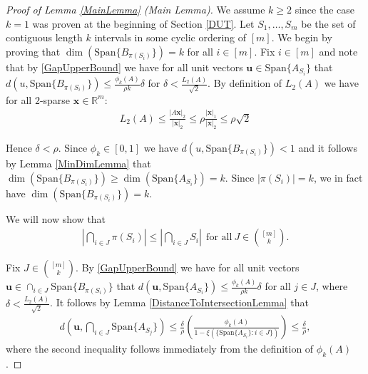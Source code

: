 \documentclass[journal, onecolumn]{IEEEtran}
\begin{document}
\begin{proof}[Proof of Lemma \ref{MainLemma} (Main Lemma)]
We assume $k \geq 2$ since the case $k = 1$ was proven at the beginning of Section \ref{DUT}. Let $S_1, \ldots, S_m$ be the set of contiguous length $k$ intervals in some cyclic ordering of $[m]$. We begin by proving that $\dim(\text{Span}\{B_{\pi(S_i)}\}) = k$ for all $i \in [m]$. 
Fix $i \in [m]$ and note that by \eqref{GapUpperBound} we have for all unit vectors $\mathbf{u} \in \text{Span}\{A_{S_i}\}$ that $d(u, \text{Span}\{B_{\pi(S_i)}\}) \leq \frac{\phi_k(A)}{\rho k} \delta$ for $\delta < \frac{L_2(A)}{ \sqrt{2}}$. By definition of $L_2(A)$ we have for all $2$-sparse $\mathbf{x} \in \mathbb{R}^m$:
\begin{align}
L_2(A) \leq \frac{|A\mathbf{x}|_2}{|\mathbf{x}|_2} \leq \rho \frac{|\mathbf{x}|_1}{|\mathbf{x}|_2} \leq \rho \sqrt{2}
\end{align}

Hence $\delta < \rho$. Since $\phi_k \in [0,1]$ we have $d(u, \text{Span}\{B_{\pi(S_i)}\}) < 1$ and it follows by Lemma \ref{MinDimLemma} that $\dim(\text{Span}\{B_{\pi(S_i)}\}) \geq \dim(\text{Span}\{A_{S_i}\}) = k$. Since $|\pi(S_i)| = k$, we in fact have $\dim(\text{Span}\{B_{\pi(S_i)}\}) = k$. %

We will now show that
\begin{align}\label{fact2}
|\bigcap_{i \in J} \pi(S_i)| \leq |\bigcap_{i \in J} S_i | \ \ \text{for all} \ J \in {[m] \choose k}.
\end{align}

Fix $J \in {[m] \choose k}$. By \eqref{GapUpperBound} we have for all unit vectors $\mathbf{u} \in \cap_{i \in J} \text{Span}\{B_{\pi(S_i)}\}$ that $d(\mathbf{u}, \text{Span}\{A_{S_i}\}) \leq \frac{\phi_k(A)}{\rho k} \delta$ for all $j \in J$, where $\delta < \frac{L_2(A)}{\sqrt{2}}$. It follows by Lemma \ref{DistanceToIntersectionLemma} that
\begin{align*}
d\left( \mathbf{u}, \bigcap_{i \in J} \text{Span}\{A_{S_j}\} \right) 
\leq \frac{\delta}{\rho} \left( \frac{ \phi_k(A) }{1 - \xi( \{ \text{Span}\{A_{S_i}\}: i \in J\} ) } \right) \leq \frac{\delta}{\rho},
\end{align*}
%
where the second inequality follows immediately from the definition of $\phi_k(A)$. 


\end{proof}
\end{document}
